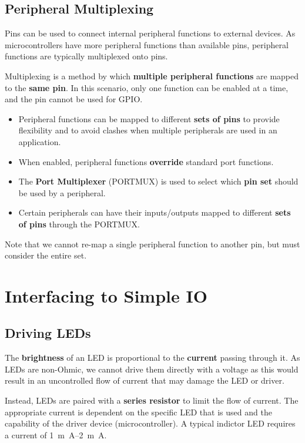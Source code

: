 \documentclass[a4paper]{report}
\begin{document}
\subsection{Peripheral Multiplexing}
Pins can be used to connect internal peripheral functions to external
devices. As microcontrollers have more peripheral functions than
available pins, peripheral functions are typically multiplexed onto
pins.
\begin{definition}[Multiplexing]
    Multiplexing is a method by which \textbf{multiple peripheral functions}
    are mapped to the \textbf{same pin}.
    In this scenario, only one function can be enabled at a time, and the pin
    cannot be used for GPIO\@.
\end{definition}
\begin{itemize}
    \item Peripheral functions can be mapped to different \textbf{sets
          of pins} to provide flexibility and to avoid clashes when
          multiple peripherals are used in an application.
    \item When enabled, peripheral functions \textbf{override} standard
          port functions.
    \item The \textbf{Port Multiplexer} (PORTMUX) is used to select
          which \textbf{pin set} should be used by a peripheral.
    \item Certain peripherals can have their inputs/outputs mapped to
          different \textbf{sets of pins} through the PORTMUX\@.
\end{itemize}
Note that we cannot re-map a single peripheral function to another pin, but must consider the entire set.
\section{Interfacing to Simple IO}
\subsection{Driving LEDs}
The \textbf{brightness} of an LED is proportional to the
\textbf{current} passing through it. As LEDs are non-Ohmic, we cannot
drive them directly with a voltage as this would result in an
uncontrolled flow of current that may damage the LED or driver.

Instead, LEDs are paired with a \textbf{series resistor} to limit the
flow of current. The appropriate current is dependent on the specific
LED that is used and the capability of the driver device
(microcontroller). A typical indictor LED requires a current of
\qtyrange{1}{2}{m.A}.
\end{document}

